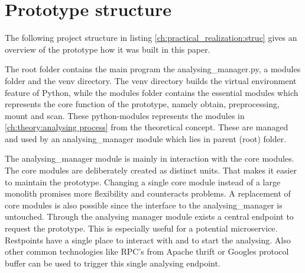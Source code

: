\section{Prototype structure}
\label{ch:practical_realization:prot_struct}
The following project structure in listing \ref{ch:practical_realization:struc} gives an overview of the prototype how it was built in this paper.


The root folder contains the main program the analysing\_manager.py, a modules folder and the venv directory.
The venv directory builds the virtual environment feature of Python, while the modules folder contains the essential modules which represents the core function of the prototype, namely obtain, preprocessing, mount and scan. These python-modules represents the modules in \ref{ch:theory:analysing process} from the theoretical concept. These are managed and used by an analysing\_manager module which lies in parent (root) folder. 

The analysing\_manager module is mainly in interaction with the core modules. The core modules are deliberately created as distinct units. That makes it easier to maintain the prototype. Changing a single core module instead of a large monolith promises more flexibility and counteracts problems. A replacement of core modules is also possible since the interface to the analysing\_manager is untouched.
Through the analysing manager module exists a central endpoint to request the prototype. This is especially useful for a potential microservice. Restpoints have a single place to interact with and to start the analysing. Also other common technologies like RPC's from Apache thrift or Googles protocol buffer can be used to trigger this single analysing endpoint. 

